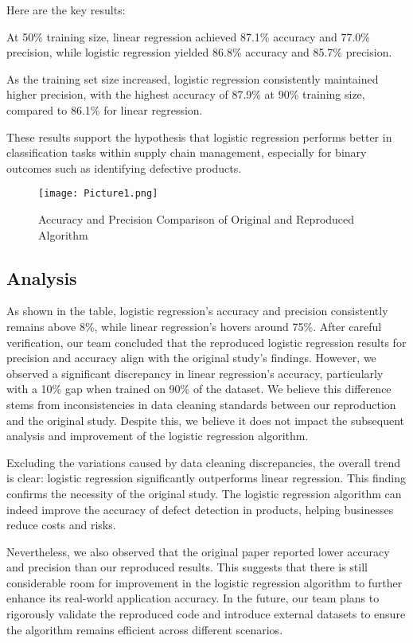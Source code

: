 \documentclass[conference]{IEEEtran}
\begin{document}
Here are the key results:

At 50\% training size, linear regression achieved 87.1\% accuracy and 77.0\% precision, while logistic regression yielded 86.8\% accuracy and 85.7\% precision.

As the training set size increased, logistic regression consistently maintained higher precision, with the highest accuracy of 87.9\% at 90\% training size, compared to 86.1\% for linear regression.

These results support the hypothesis that logistic regression performs better in classification tasks within supply chain management, especially for binary outcomes such as identifying defective products.

\begin{figure}[h]
    \centering
    \texttt{[image: Picture1.png]}
    \caption{Accuracy and Precision Comparison of Original and Reproduced Algorithm}
    \label{fig:enter-label}
\end{figure}

\subsection{Analysis}
As shown in the table, logistic regression's accuracy and precision consistently remains above 8\%, while linear regression's hovers around 75\%. After careful verification, our team concluded that the reproduced logistic regression results for precision and accuracy align with the original study's findings. However, we observed a significant discrepancy in linear regression's accuracy, particularly with a 10\% gap when trained on 90\% of the dataset. We believe this difference stems from inconsistencies in data cleaning standards between our reproduction and the original study. Despite this, we believe it does not impact the subsequent analysis and improvement of the logistic regression algorithm.

Excluding the variations caused by data cleaning discrepancies, the overall trend is clear: logistic regression significantly outperforms linear regression. This finding confirms the necessity of the original study. The logistic regression algorithm can indeed improve the accuracy of defect detection in products, helping businesses reduce costs and risks.

Nevertheless, we also observed that the original paper reported lower accuracy and precision than our reproduced results. This suggests that there is still considerable room for improvement in the logistic regression algorithm to further enhance its real-world application accuracy. In the future, our team plans to rigorously validate the reproduced code and introduce external datasets to ensure the algorithm remains efficient across different scenarios.
\end{document}
